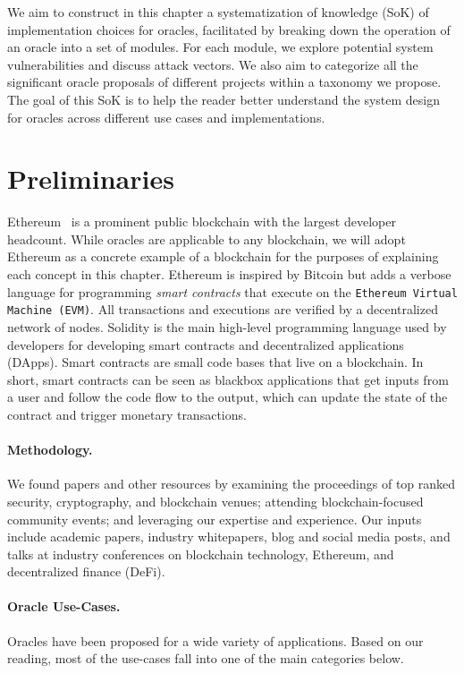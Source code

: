 We aim to construct in this chapter a systematization of knowledge (SoK) of implementation choices for oracles, facilitated by breaking down the operation of an oracle into a set of modules. For each module, we explore potential system vulnerabilities and discuss attack vectors. We also aim to categorize all the significant oracle proposals of different projects within a taxonomy we propose. The goal of this SoK is to help the reader better understand the system design for oracles across different use cases and implementations.

\section{Preliminaries}

Ethereum~\cite{wood2014ethereum} is a prominent public blockchain with the largest developer headcount. While oracles are applicable to any blockchain, we will adopt Ethereum as a concrete example of a blockchain for the purposes of explaining each concept in this chapter. Ethereum is inspired by Bitcoin but adds a verbose language for programming \textit{smart contracts} that execute on the \texttt{Ethereum Virtual Machine (EVM)}. All transactions and executions are verified by a decentralized network of nodes. Solidity is the main high-level programming language used by developers for developing smart contracts and decentralized applications (DApps). Smart contracts are small code bases that live on a blockchain. In short, smart contracts can be seen as blackbox applications that get inputs from a user and follow the code flow to the output, which can update the state of the contract and trigger monetary transactions. 

\paragraph{Methodology.} We found papers and other resources by examining the proceedings of top ranked security, cryptography, and blockchain venues; attending blockchain-focused community events; and leveraging our expertise and experience. Our inputs include academic papers, industry whitepapers, blog and social media posts, and talks at industry conferences on blockchain technology, Ethereum, and decentralized finance (DeFi). 


\paragraph{Oracle Use-Cases.} Oracles have been proposed for a wide variety of applications. Based on our reading, most of the use-cases fall into one of the main categories below.

